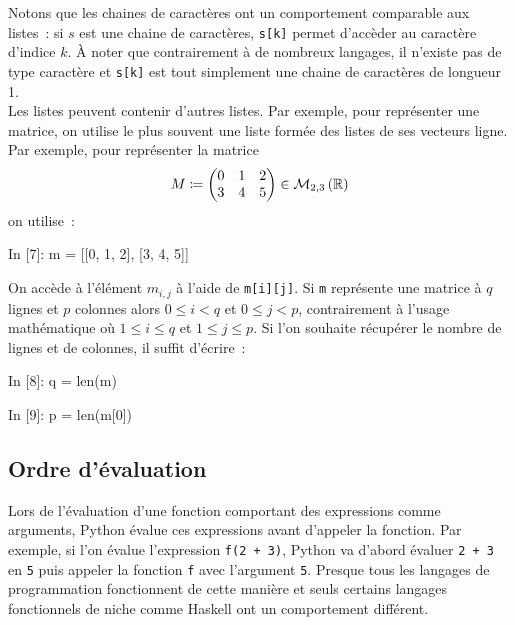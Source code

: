 \documentclass{magnolia}
\begin{document}
Notons 
que les chaines de caractères ont un comportement comparable aux listes~: si $s$ est une chaine de
caractères, \verb!s[k]! permet d'accèder au caractère d'indice $k$. À noter que contrairement à de nombreux
langages, il n'existe pas de type \og caractère \fg et \verb!s[k]! est tout simplement une chaine de
caractères de longueur 1.\\



Les listes peuvent contenir d'autres listes.
Par exemple, pour représenter une matrice, on utilise le plus souvent une liste
formée des listes de ses vecteurs ligne. Par exemple, pour représenter
la matrice
\[M\coloneqq\begin{pmatrix}
  0 & 1 & 2\\
  3 & 4 & 5
\end{pmatrix}\in\mathcal{M}_{2,3}\left(\mathbb{R}\right)\]
on utilise~:
\begin{pythoncode}
In [7]: m = [[0, 1, 2], [3, 4, 5]]
\end{pythoncode}
On accède à l'élément $m_{i,j}$ à l'aide de
\verb!m[i][j]!. Si \verb!m! représente une matrice à $q$ lignes et
$p$ colonnes alors $0\leq i<q$ et $0\leq j <p$, contrairement à l'usage
mathématique où $1\leq i\leq q$ et $1\leq j\leq p$. Si l'on souhaite
récupérer le nombre de lignes et de colonnes, il suffit d'écrire~:
\begin{pythoncode}
In [8]: q = len(m)

In [9]: p = len(m[0])
\end{pythoncode}


\subsection{Ordre d'évaluation}

Lors de l'évaluation d'une fonction comportant des expressions comme arguments, Python évalue ces
expressions avant d'appeler la fonction. Par exemple, si l'on évalue
l'expression \verb_f(2 + 3)_, Python va d'abord évaluer \verb_2 + 3_ en \verb_5_
puis appeler la fonction \verb_f_ avec l'argument \verb_5_. Presque tous les langages
de programmation fonctionnent de cette manière et seuls certains langages fonctionnels
de niche comme Haskell ont un comportement différent. \\
\end{document}
